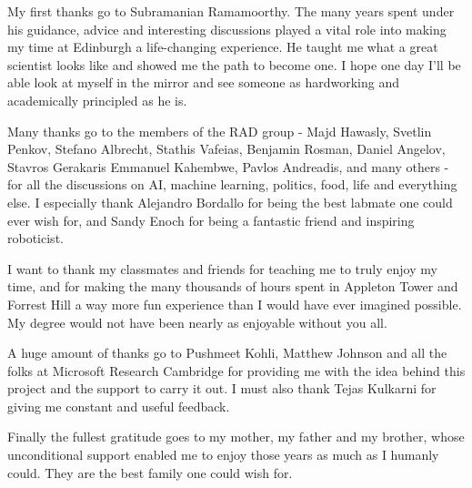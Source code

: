\begin{acknowledgements}

  My first thanks go to Subramanian Ramamoorthy. The many years spent under his
  guidance, advice and interesting discussions played a vital role into making
  my time at Edinburgh a life-changing experience. He taught me what a great
  scientist looks like and showed me the path to become one. I hope one day I'll
  be able look at myself in the mirror and see someone as hardworking and
  academically principled as he is.

  Many thanks go to the members of the RAD group - Majd Hawasly, Svetlin Penkov,
  Stefano Albrecht, Stathis Vafeias, Benjamin Rosman, Daniel Angelov, Stavros
  Gerakaris Emmanuel Kahembwe, Pavlos Andreadis, and many others - for all the
  discussions on AI, machine learning, politics, food, life and everything else.
  I especially thank Alejandro Bordallo for being the best labmate one could
  ever wish for, and Sandy Enoch for being a fantastic friend and inspiring
  roboticist.

  I want to thank my classmates and friends for teaching me to truly enjoy my
  time, and for making the many thousands of hours spent in Appleton Tower and
  Forrest Hill a way more fun experience than I would have ever imagined
  possible. My degree would not have been nearly as enjoyable without you all.

  A huge amount of thanks go to Pushmeet Kohli, Matthew Johnson and all the folks
  at Microsoft Research Cambridge for providing me with the idea behind this
  project and the support to carry it out. I must also thank Tejas Kulkarni for
  giving me constant and useful feedback. 

  Finally the fullest gratitude goes to my mother, my father and my brother,
  whose unconditional support enabled me to enjoy those years as much as I
  humanly could. They are the best family one could wish for.

\end{acknowledgements}